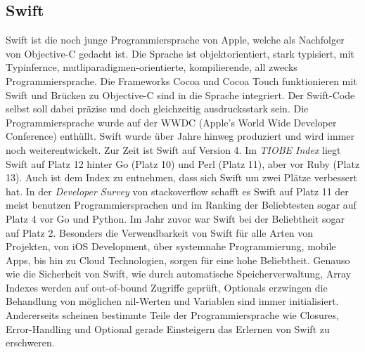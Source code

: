\subsection{Swift}
\label{subsection:swift}
Swift ist die noch junge Programmiersprache von Apple, welche als Nachfolger von Objective-C gedacht ist. Die Sprache ist objektorientiert, stark typisiert, mit Typinfernce, mutliparadigmen-orientierte, kompilierende, all zwecks Programmiersprache. Die Frameworks Cocoa und Cocoa Touch funktionieren mit Swift und Brücken zu Objective-C sind in die Sprache integriert. Der Swift-Code selbst soll dabei präzise und doch gleichzeitig ausdrucksstark sein\parencite{appleswift}.  Die Programmiersprache wurde auf der WWDC (Apple's World Wide Developer Conference)\parencite{swiftannounced} enthüllt. Swift wurde über Jahre hinweg produziert und wird immer noch weiterentwickelt. Zur Zeit ist Swift auf Version 4\parencite{ swift4}. Im \textit{TIOBE Index}\parencite[][Stand Juli 2017]{tiobe} liegt Swift auf Platz 12 hinter Go (Platz 10) und Perl (Platz 11), aber vor Ruby (Platz 13). Auch ist dem Index zu entnehmen, dass sich Swift um zwei Plätze verbessert hat. In der \textit{Developer Survey} von stackoverflow schafft es Swift auf Platz 11 der meist benutzen Programmiersprachen und im Ranking der Beliebtesten sogar auf Platz 4 vor Go und Python\parencite{survey2017}. Im Jahr zuvor war Swift bei der Beliebtheit sogar auf Platz 2\parencite{survey2016}. Besonders die Verwendbarkeit von Swift für alle Arten von Projekten, von iOS Development, über systemnahe Programmierung, mobile Apps, bis hin zu Cloud Technologien, sorgen für eine hohe Beliebtheit. Genauso wie die Sicherheit von Swift, wie durch automatische Speicherverwaltung, Array Indexes werden auf out-of-bound Zugriffe geprüft, Optionals erzwingen die Behandlung von möglichen nil-Werten und Variablen sind immer initialisiert. Andererseits scheinen bestimmte Teile der Programmiersprache wie Closures, Error-Handling und Optional gerade Einsteigern das Erlernen von Swift zu erschweren\parencite{studyonswift}.
